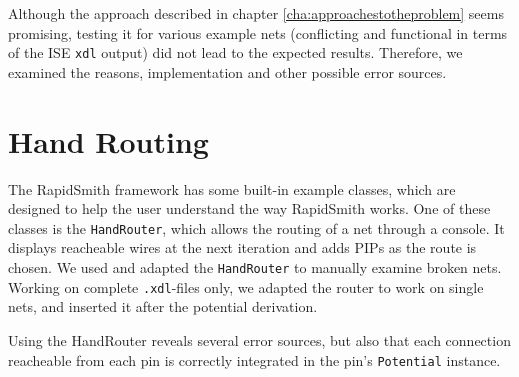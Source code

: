 Although the approach described in chapter \ref{cha:approachestotheproblem} seems promising, testing it for various example nets (conflicting and functional in terms of the ISE \texttt{xdl} output) did not lead to the expected results. Therefore, we examined the reasons, implementation and other possible error sources.

\section{Hand Routing}
\label{sec:handrouting}

The RapidSmith framework has some built-in example classes, which are designed to help the user understand the way RapidSmith works. One of these classes is the \texttt{HandRouter}, which allows the routing of a net through a console. It displays reacheable wires at the next iteration and adds PIPs as the route is chosen. We used and adapted the \texttt{HandRouter} to manually examine broken nets. Working on complete \texttt{.xdl}-files only, we adapted the router to work on single nets, and inserted it after the potential derivation.

Using the HandRouter reveals several error sources, but also that each connection reacheable from each pin is correctly integrated in the pin's \texttt{Potential} instance. 

